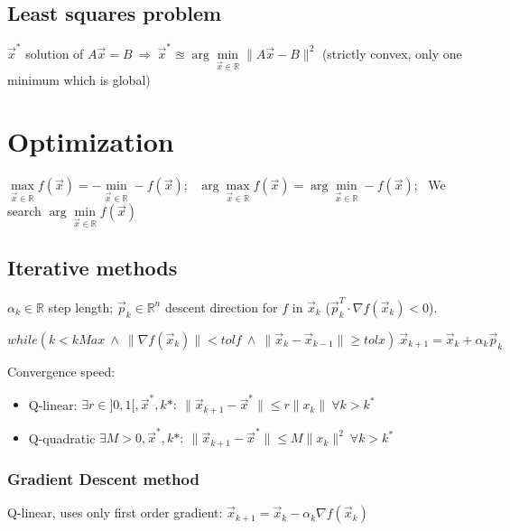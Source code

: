 \documentclass[]{article}
\begin{document}
	
	\subsection{Least squares problem}
	
	$\vec{x}^*$ solution of $A \vec{x} = B \ \Rightarrow \ \vec{x}^* \approxeq \arg\min\limits_{\vec{x}\in \mathbb{R}}\lVert A \vec{x} - B \rVert^2$ (strictly convex, only one minimum which is global)
	
	\section{Optimization}
	
	$\max\limits_{\vec{x}\in\mathbb{R}} f(\vec{x}) = -\min\limits_{\vec{x}\in\mathbb{R}} -f(\vec{x})$; \ 
	$\arg\max\limits_{\vec{x}\in\mathbb{R}} f(\vec{x}) = \arg\min\limits_{\vec{x}\in\mathbb{R}} -f(\vec{x})$; \ 
	We search $\arg\min\limits_{\vec{x}\in\mathbb{R}} f(\vec{x})$
	
	\subsection{Iterative methods}
	
	$\alpha_k \in \mathbb{R}$ step length; $\vec{p}_k \in \mathbb{R}^n$ descent direction for $f$ in $\vec{x}_k$ ($\vec{p}_k^T \cdot \nabla f(\vec{x}_k) < 0$).
	
	$while ( k < kMax \ \land \ \lVert \nabla f(\vec{x}_k) \rVert < tolf \ \land \ \lVert \vec{x}_k - \vec{x}_{k-1} \rVert \ge tolx ) \  \vec{x}_{k+1} = \vec{x}_k + \alpha_k \vec{p}_k$
	
	Convergence speed:
	\begin{itemize}
		\item Q-linear: $\exists r\in]0,1[, \vec{x}^*, k*: \  \lVert \vec{x}_{k+1}-\vec{x}^* \rVert \le r \lVert x_k \rVert \ \forall k > k^*$
		\item Q-quadratic $\exists M>0, \vec{x}^*, k*: \  \lVert \vec{x}_{k+1}-\vec{x}^* \rVert \le M \lVert x_k \rVert^2 \ \forall k > k^*$
	\end{itemize}
	
	\subsubsection{Gradient Descent method}
		
	Q-linear, uses only first order gradient: $\vec{x}_{k+1} = \vec{x}_k - \alpha_k \nabla f(\vec{x}_k)$
	
\end{document}
